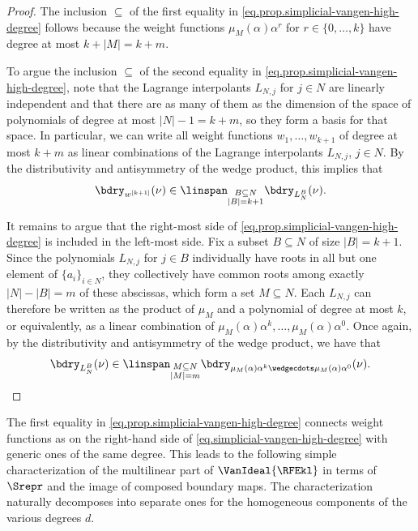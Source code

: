 \begin{proof}
The inclusion $\subseteq$ of the first equality in \eqref{eq.prop.simplicial-vangen-high-degree} follows because the weight functions $\mu_M(\alpha) \alpha^r$ for $r \in \{0,\dots,k\}$ have degree at most $k+|M|=k+m$. 

To argue the inclusion $\subseteq$ of the second equality in \eqref{eq.prop.simplicial-vangen-high-degree}, note that the Lagrange interpolants $L_{N,j}$ for $j \in N$ are linearly independent and that there are as many of them as the dimension of the space of polynomials of degree at most $|N|-1=k+m$, so they form a basis for that space. In particular, we can write all weight functions $w_1,\dots,w_{k+1}$ of degree at most $k+m$ as linear combinations of the Lagrange interpolants $L_{N,j}$, $j \in N$. By the distributivity and antisymmetry of the wedge product, this implies that
\begin{equation*}
\bdry_{w^{[k+1]}}(\nu)  \in 
\linspan_{\substack{B \subseteq N \\ |B|=k+1}} \bdry_{L_N^B}(\nu).
\end{equation*}

It remains to argue that the right-most side of \eqref{eq.prop.simplicial-vangen-high-degree} is included in the left-most side. Fix a subset $B \subseteq N$ of size $|B|=k+1$. Since the polynomials $L_{N,j}$ for $j \in B$ individually have roots in all but one element of $\{a_i\}_{i \in N}$, they collectively have common roots among exactly $|N|-|B|=m$ of these abscissas, which form a set $M \subseteq N$. Each $L_{N,j}$ can therefore be written as the product of $\mu_M$ and a polynomial of degree at most $k$, or equivalently, as a linear combination of $\mu_{M}(\alpha)\alpha^k,\dots,\mu_{M}(\alpha)\alpha^0$. Once again, by the distributivity and antisymmetry of the wedge product, we have that 
\begin{equation*}
\bdry_{L_N^B}(\nu) \in 
\linspan_{\substack{M \subseteq N \\ |M|=m}}
\bdry_{\mu_M(\alpha)\alpha^k\wedgecdots\mu_M(\alpha)\alpha^0}(\nu).
\qedhere
\end{equation*}
\end{proof}

The first equality in \eqref{eq.prop.simplicial-vangen-high-degree} connects weight functions as on the right-hand side of \eqref{eq.simplicial-vangen-high-degree} with generic ones of the same degree. This leads to the following simple characterization of the multilinear part of $\VanIdeal{\RFEkl}$ in terms of $\Srepr$ and the image of composed boundary maps. The characterization naturally decomposes into separate ones for the homogeneous components of the various degrees $d$. 

